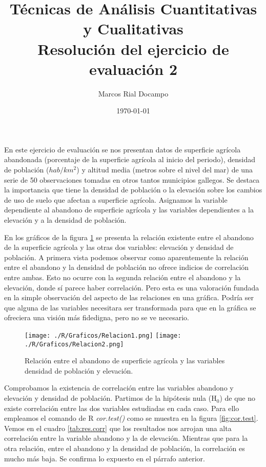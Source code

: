 \documentclass[11pt,a4paper]{article}
\author{Marcos Rial Docampo}
\title{Técnicas de Análisis Cuantitativas y Cualitativas\\Resolución del ejercicio de evaluación 2}
\date{\small{\today}}
\begin{document}
\maketitle

En este ejercicio de evaluación se nos presentan datos de superficie agrícola abandonada (porcentaje de la superficie agrícola al inicio del periodo), densidad de población ($hab/km^{2}$) y altitud media (metros sobre el nivel del mar) de una serie de 50 observaciones tomadas en otros tantos municipios gallegos. Se destaca la importancia que tiene la densidad de población o la elevación sobre los cambios de uso de suelo que afectan a superficie agrícola. Asignamos la variable dependiente al abandono de superficie agrícola y las variables dependientes a la elevación y a la densidad de población.

En los gráficos de la figura \ref{fig:graficas} se presenta la relación existente entre el abandono de la superficie agrícola y las otras dos variables: elevación y densidad de población. A primera vista podemos observar como aparentemente la relación entre el abandono y la densidad de población no ofrece indicios de correlación entre ambas. Esto no ocurre con la segunda relación entre el abandono y la elevación, donde sí parece haber correlación. Pero esta es una valoración fundada en la simple observación del aspecto de las relaciones en una gráfica. Podría ser que alguna de las variables necesitara ser transformada para que en la gráfica se ofreciera una visión más fidedigna, pero no se ve necesario.

\begin{figure}
	\centering
	\texttt{[image: ./R/Graficos/Relacion1.png]}
	\texttt{[image: ./R/Graficos/Relacion2.png]}
	\caption{Relación entre el abandono de superficie agrícola y las variables densidad de población y elevación.}
	\label{fig:graficas}
\end{figure}

Comprobamos la existencia de correlación entre las variables abandono y elevación y densidad de población. Partimos de la hipótesis nula (H$_0$) de que no existe correlación entre las dos variables estudiadas en cada caso. Para ello empleamos el comando de R \textit{cor.test()} como se muestra en la figura \ref{fig:cor.test}. Vemos en el cuadro \ref{tab:res.corr} que los resultados nos arrojan una alta correlación entre la variable abandono y la de elevación. Mientras que para la otra relación, entre el abandono y la densidad de población, la correlación es mucho más baja. Se confirma lo expuesto en el párrafo anterior.
\end{document}
